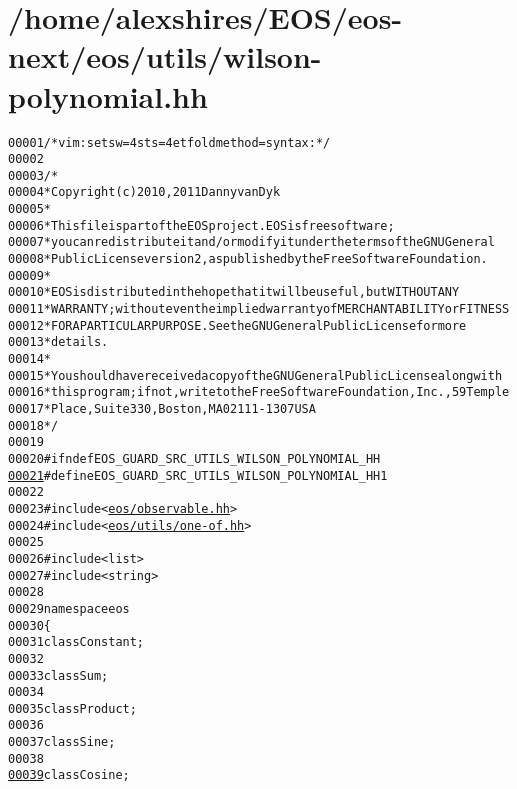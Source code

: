 \hypertarget{wilson-polynomial_8hh_source}{
\section{/home/alexshires/EOS/eos-\/next/eos/utils/wilson-\/polynomial.hh}
}


\begin{footnotesize}\begin{alltt}
00001 \textcolor{comment}{/* vim: set sw=4 sts=4 et foldmethod=syntax : */}
00002 
00003 \textcolor{comment}{/*}
00004 \textcolor{comment}{ * Copyright (c) 2010, 2011 Danny van Dyk}
00005 \textcolor{comment}{ *}
00006 \textcolor{comment}{ * This file is part of the EOS project. EOS is free software;}
00007 \textcolor{comment}{ * you can redistribute it and/or modify it under the terms of the GNU General}
00008 \textcolor{comment}{ * Public License version 2, as published by the Free Software Foundation.}
00009 \textcolor{comment}{ *}
00010 \textcolor{comment}{ * EOS is distributed in the hope that it will be useful, but WITHOUT ANY}
00011 \textcolor{comment}{ * WARRANTY; without even the implied warranty of MERCHANTABILITY or FITNESS}
00012 \textcolor{comment}{ * FOR A PARTICULAR PURPOSE.  See the GNU General Public License for more}
00013 \textcolor{comment}{ * details.}
00014 \textcolor{comment}{ *}
00015 \textcolor{comment}{ * You should have received a copy of the GNU General Public License along with}
00016 \textcolor{comment}{ * this program; if not, write to the Free Software Foundation, Inc., 59 Temple}
00017 \textcolor{comment}{ * Place, Suite 330, Boston, MA  02111-1307  USA}
00018 \textcolor{comment}{ */}
00019 
00020 \textcolor{preprocessor}{#ifndef EOS\_GUARD\_SRC\_UTILS\_WILSON\_POLYNOMIAL\_HH}
\hypertarget{wilson-polynomial_8hh_source_l00021}{}\hyperlink{wilson-polynomial_8hh_ae33bd5eb549806a3ba3d61f54994bfba}{00021} \textcolor{preprocessor}{}\textcolor{preprocessor}{#define EOS\_GUARD\_SRC\_UTILS\_WILSON\_POLYNOMIAL\_HH 1}
00022 \textcolor{preprocessor}{}
00023 \textcolor{preprocessor}{#include <\hyperlink{observable_8hh}{eos/observable.hh}>}
00024 \textcolor{preprocessor}{#include <\hyperlink{one-of_8hh}{eos/utils/one-of.hh}>}
00025 
00026 \textcolor{preprocessor}{#include <list>}
00027 \textcolor{preprocessor}{#include <string>}
00028 
00029 \textcolor{keyword}{namespace }eos
00030 \{
00031     \textcolor{keyword}{class }Constant;
00032 
00033     \textcolor{keyword}{class }Sum;
00034 
00035     \textcolor{keyword}{class }Product;
00036 
00037     \textcolor{keyword}{class }Sine;
00038 
\hypertarget{wilson-polynomial_8hh_source_l00039}{}\hyperlink{namespaceeos_ad0c57fa62d09f6465421603cb5285284}{00039}     \textcolor{keyword}{class }Cosine;

\end{alltt}
\end{footnotesize}
